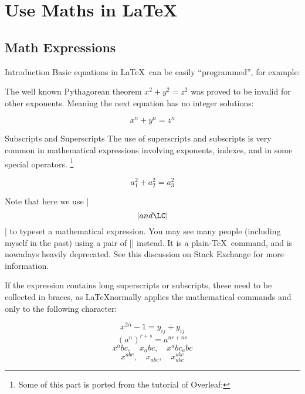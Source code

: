 \section{Use Maths in \LaTeX}

\subsection{Math Expressions}

\begin{frame}[fragile]{Introduction}
Basic equations in \LaTeX\ can be easily ``programmed'', for example: 
\begin{latexexample}
The well known Pythagorean theorem \(x^2 + y^2 = z^2\) was 
proved to be invalid for other exponents. 
Meaning the next equation has no integer solutions:

\[ x^n + y^n = z^n \]
\end{latexexample}
\end{frame}

\begin{frame}[fragile]{Subscripts and Superscripts}
The use of superscripts and subscripts is very common in mathematical expressions involving exponents, indexes, and in some special operators. \footnote[1]{Some of this part is ported from the tutorial of Overleaf: }

\begin{latexexample}
\[ a_1^2 + a_2^2 = a_3^2 \]
\end{latexexample}

Note that here we use \LC|\[| and \LC|\]| to typeset a mathematical expression. You may see many people (including myself in the past) using a pair of \LC|$$| instead. It is a plain-\TeX\ command, and is nowadays heavily deprecated. See this discussion  on Stack Exchange for more information. 

\end{frame}

\begin{frame}[fragile]

If the expression contains long superscripts or subscripts, these need to be collected in braces, as \LaTeX normally applies the mathematical commands \LC{^} and \LC{_} only to the following character:

\begin{latexexample}
\[ x^{2 \alpha} - 1 = y_{ij} + y_{ij}  \]
\[ (a^n)^{r+s} = a^{nr+ns}  \]
\[ x^abc, \quad x_abc, \quad x^abc_abc \]
\[ x^{abc}, \quad x_{abc}, \quad x^{abc}_{abc} \]
\end{latexexample}

\end{frame}

